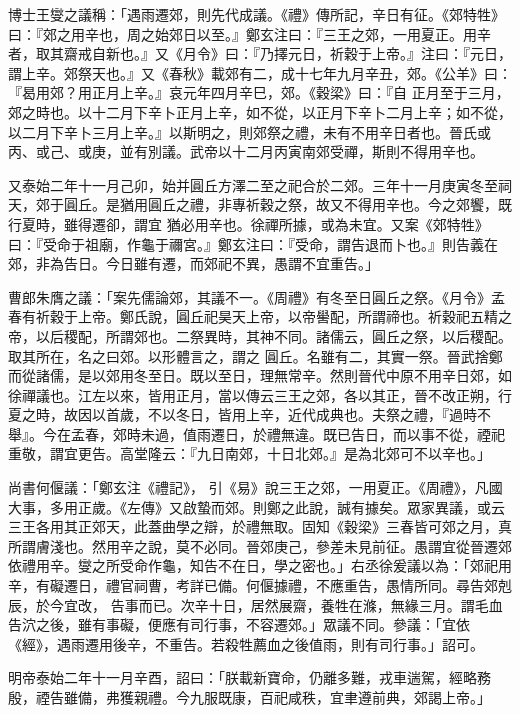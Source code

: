 \begin{pinyinscope}
 博士王燮之議稱：「遇雨遷郊，則先代成議。《禮》傳所記，辛日有征。《郊特牲》曰：『郊之用辛也，周之始郊日以至。』鄭玄注曰：『三王之郊，一用夏正。用辛者，取其齋戒自新也。』又《月令》曰：『乃擇元日，祈穀于上帝。』注曰：『元日，謂上辛。郊祭天也。』又《春秋》載郊有二，成十七年九月辛丑，郊。《公羊》曰：『曷用郊？用正月上辛。』哀元年四月辛巳，郊。《穀梁》曰：『自
 正月至于三月，郊之時也。以十二月下辛卜正月上辛，如不從，以正月下辛卜二月上辛；如不從，以二月下辛卜三月上辛。』以斯明之，則郊祭之禮，未有不用辛日者也。晉氏或丙、或己、或庚，並有別議。武帝以十二月丙寅南郊受禪，斯則不得用辛也。



 又泰始二年十一月己卯，始并圓丘方澤二至之祀合於二郊。三年十一月庚寅冬至祠天，郊于圓丘。是猶用圓丘之禮，非專祈穀之祭，故又不得用辛也。今之郊饗，既行夏時，雖得遷卻，謂宜
 猶必用辛也。徐禪所據，或為未宜。又案《郊特牲》曰：『受命于祖廟，作龜于禰宮。』鄭玄注曰：『受命，謂告退而卜也。』則告義在郊，非為告日。今日雖有遷，而郊祀不異，愚謂不宜重告。」



 曹郎朱膺之議：「案先儒論郊，其議不一。《周禮》有冬至日圓丘之祭。《月令》孟春有祈穀于上帝。鄭氏說，圓丘祀昊天上帝，以帝嚳配，所謂禘也。祈穀祀五精之帝，以后稷配，所謂郊也。二祭異時，其神不同。諸儒云，圓丘之祭，以后稷配。取其所在，名之曰郊。以形體言之，謂之
 圓丘。名雖有二，其實一祭。晉武捨鄭而從諸儒，是以郊用冬至日。既以至日，理無常辛。然則晉代中原不用辛日郊，如徐禪議也。江左以來，皆用正月，當以傳云三王之郊，各以其正，晉不改正朔，行夏之時，故因以首歲，不以冬日，皆用上辛，近代成典也。夫祭之禮，『過時不舉』。今在孟春，郊時未過，值雨遷日，於禮無違。既已告日，而以事不從，禋祀重敬，謂宜更告。高堂隆云：『九日南郊，十日北郊。』是為北郊可不以辛也。」



 尚書何偃議：「鄭玄注《禮記》，
 引《易》說三王之郊，一用夏正。《周禮》，凡國大事，多用正歲。《左傳》又啟蟄而郊。則鄭之此說，誠有據矣。眾家異議，或云三王各用其正郊天，此蓋曲學之辯，於禮無取。固知《穀梁》三春皆可郊之月，真所謂膚淺也。然用辛之說，莫不必同。晉郊庚己，參差未見前征。愚謂宜從晉遷郊依禮用辛。燮之所受命作龜，知告不在日，學之密也。」右丞徐爰議以為：「郊祀用辛，有礙遷日，禮官祠曹，考詳已備。何偃據禮，不應重告，愚情所同。尋告郊剋辰，於今宜改，
 告事而已。次辛十日，居然展齋，養牲在滌，無緣三月。謂毛血告泬之後，雖有事礙，便應有司行事，不容遷郊。」眾議不同。參議：「宜依《經》，遇雨遷用後辛，不重告。若殺牲薦血之後值雨，則有司行事。」詔可。



 明帝泰始二年十一月辛酉，詔曰：「朕載新寶命，仍離多難，戎車遄駕，經略務殷，禋告雖備，弗獲親禮。今九服既康，百祀咸秩，宜聿遵前典，郊謁上帝。」




\end{pinyinscope}

